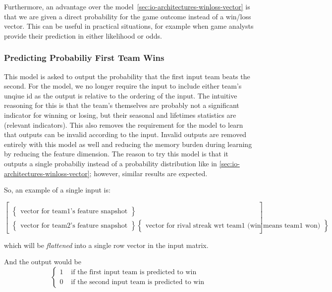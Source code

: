 \documentclass{article} %
\begin{document}
Furthermore, an advantage over the model~\ref{sec:io-architectures-winloss-vector} is that we are given a direct probability for the game outcome instead of a win/loss vector.  This can be useful in practical situations, for example when game analysts provide their prediction in either likelihood or odds.


\subsubsection{Predicting Probabiliy First Team Wins}
\label{sec:io-architectures-first-team-probability}

This model is asked to output the probability that the first input team beats the second. For the model, we no longer require the input to include either team's unqiue id as the output is relative to the ordering of the input.  The intuitive reasoning for this is that the team's themselves are probably not a significant indicator for winning or losing, but their seasonal and lifetimes statistics are (relevant indicators).  This also removes the requirement for the model to learn that outputs can be invalid according to the input.  Invalid outputs are removed entirely with this model as well and reducing the memory burden during learning by reducing the feature dimension.  The reason to try this model is that it outputs a single probabiliy instead of a probability distribution like in \ref{sec:io-architectures-winloss-vector}; however, similar results are expected.

So, an example of a single input is:

\[
\begin{bmatrix}
  \\
  \begin{Bmatrix}
    \text{vector for team1's feature snapshot}
  \end{Bmatrix}
  \\
  \begin{Bmatrix}
    \text{vector for team2's feature snapshot}
  \end{Bmatrix}
  \begin{Bmatrix}
    \text{vector for rival streak wrt team1 (win means team1 won)}
  \end{Bmatrix}
\end{bmatrix}
\]

which will be \textit{flattened} into a single row vector in the input matrix.

And the output would be
\[
\begin{cases}
  1 & \text{ if the first input team is predicted to win}
  \\
  0 & \text{ if the second input team is predicted to win}
\end{cases}
\]
\end{document}
